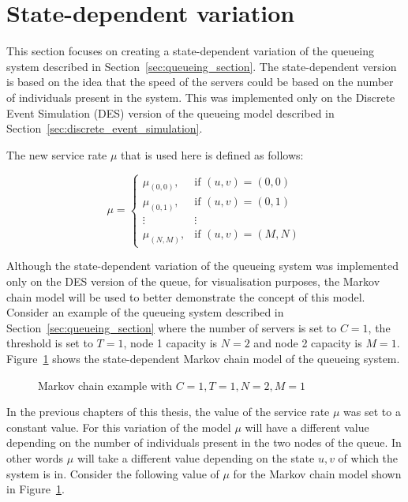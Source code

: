 \section{State-dependent variation}\label{sec:state_dependent}

This section focuses on creating a state-dependent variation of the queueing
system described in Section~\ref{sec:queueing_section}.
The state-dependent version is based on the idea that the speed of the servers
could be based on the number of individuals present in the system.
This was implemented only on the Discrete Event Simulation (DES) version of
the queueing model described in Section~\ref{sec:discrete_event_simulation}.

The new service rate \(\mu\) that is used here is defined as follows:

\begin{equation*}
    \mu =
    \begin{cases}
        \mu_{(0,0)}, & \text{if } (u, v) = (0, 0) \\
        \mu_{(0,1)}, & \text{if } (u, v) = (0, 1) \\
        \vdots & \vdots \\
        \mu_{(N,M)}, & \text{if } (u, v) = (M, N)
    \end{cases}
\end{equation*}

Although the state-dependent variation of the queueing system was implemented
only on the DES version of the queue, for visualisation purposes, the Markov
chain model will be used to better demonstrate the concept of this model.
Consider an example of the queueing system described in
Section~\ref{sec:queueing_section} where the number of servers is set to
\(C = 1\), the threshold is set to \(T = 1\), node 1 capacity is \(N = 2\) and
node 2 capacity is \(M = 1\).
Figure~\ref{fig:state_dependent_markov_example} shows the state-dependent
Markov chain model of the queueing system.

\begin{figure}[H]
    \centering
    
    \caption{Markov chain example with \(C=1, T=1, N=2, M=1\)}
    \label{fig:state_dependent_markov_example}
\end{figure}

In the previous chapters of this thesis, the value of the service rate \(\mu\)
was set to a constant value.
For this variation of the model \(\mu\) will have a different value depending
on the number of individuals present in the two nodes of the queue.
In other words \(\mu\) will take a different value depending on the state
\(u, v\) of which the system is in.
Consider the following value of \(\mu\) for the Markov chain model shown in
Figure~\ref{fig:state_dependent_markov_example}.

